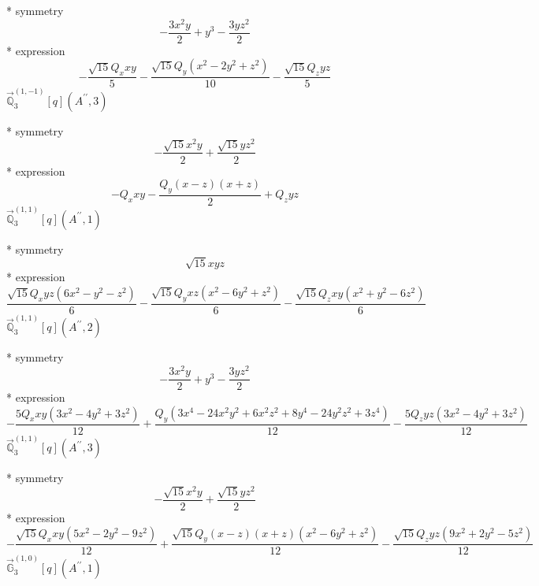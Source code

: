 \documentclass[fleqn,8pt]{jsarticle}
\begin{document}
\noindent\quad ** symmetry
\begin{dmath*}
- \frac{3 x^{2} y}{2} + y^{3} - \frac{3 y z^{2}}{2}
\end{dmath*}
\noindent\quad ** expression
\begin{dmath*}
- \frac{\sqrt{15} Q_{x} x y}{5} - \frac{\sqrt{15} Q_{y} \left(x^{2} - 2 y^{2} + z^{2}\right)}{10} - \frac{\sqrt{15} Q_{z} y z}{5}
\end{dmath*}
\noindent\quad $\vec{\mathbb{Q}}_{3}^{(1,-1)}[q](A^{\prime\prime},3)$

\noindent\quad ** symmetry
\begin{dmath*}
- \frac{\sqrt{15} x^{2} y}{2} + \frac{\sqrt{15} y z^{2}}{2}
\end{dmath*}
\noindent\quad ** expression
\begin{dmath*}
- Q_{x} x y - \frac{Q_{y} \left(x - z\right) \left(x + z\right)}{2} + Q_{z} y z
\end{dmath*}
\noindent\quad $\vec{\mathbb{Q}}_{3}^{(1,1)}[q](A^{\prime\prime},1)$

\noindent\quad ** symmetry
\begin{dmath*}
\sqrt{15} x y z
\end{dmath*}
\noindent\quad ** expression
\begin{dmath*}
\frac{\sqrt{15} Q_{x} y z \left(6 x^{2} - y^{2} - z^{2}\right)}{6} - \frac{\sqrt{15} Q_{y} x z \left(x^{2} - 6 y^{2} + z^{2}\right)}{6} - \frac{\sqrt{15} Q_{z} x y \left(x^{2} + y^{2} - 6 z^{2}\right)}{6}
\end{dmath*}
\noindent\quad $\vec{\mathbb{Q}}_{3}^{(1,1)}[q](A^{\prime\prime},2)$

\noindent\quad ** symmetry
\begin{dmath*}
- \frac{3 x^{2} y}{2} + y^{3} - \frac{3 y z^{2}}{2}
\end{dmath*}
\noindent\quad ** expression
\begin{dmath*}
- \frac{5 Q_{x} x y \left(3 x^{2} - 4 y^{2} + 3 z^{2}\right)}{12} + \frac{Q_{y} \left(3 x^{4} - 24 x^{2} y^{2} + 6 x^{2} z^{2} + 8 y^{4} - 24 y^{2} z^{2} + 3 z^{4}\right)}{12} - \frac{5 Q_{z} y z \left(3 x^{2} - 4 y^{2} + 3 z^{2}\right)}{12}
\end{dmath*}
\noindent\quad $\vec{\mathbb{Q}}_{3}^{(1,1)}[q](A^{\prime\prime},3)$

\noindent\quad ** symmetry
\begin{dmath*}
- \frac{\sqrt{15} x^{2} y}{2} + \frac{\sqrt{15} y z^{2}}{2}
\end{dmath*}
\noindent\quad ** expression
\begin{dmath*}
- \frac{\sqrt{15} Q_{x} x y \left(5 x^{2} - 2 y^{2} - 9 z^{2}\right)}{12} + \frac{\sqrt{15} Q_{y} \left(x - z\right) \left(x + z\right) \left(x^{2} - 6 y^{2} + z^{2}\right)}{12} - \frac{\sqrt{15} Q_{z} y z \left(9 x^{2} + 2 y^{2} - 5 z^{2}\right)}{12}
\end{dmath*}
\noindent\quad $\vec{\mathbb{G}}_{3}^{(1,0)}[q](A^{\prime\prime},1)$
\end{document}
